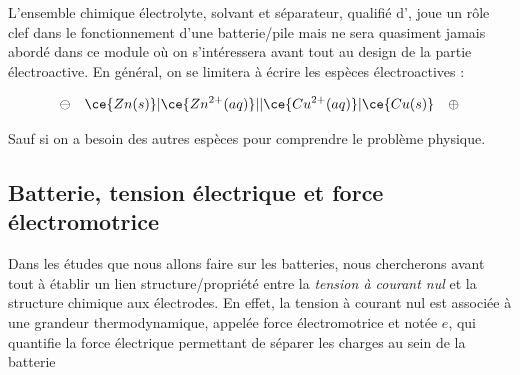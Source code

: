L'ensemble chimique électrolyte, solvant et séparateur, qualifié d', joue un rôle clef dans le fonctionnement d'une batterie/pile mais ne sera quasiment jamais abordé dans ce module où on s'intéressera avant tout au design de la partie électroactive. En général, on se limitera à écrire les espèces électroactives : 

\begin{equation*}
\ominus \quad \ce{Zn(s)} | \ce{Zn^{2+} (aq)} || \ce{Cu^{2+} (aq)} | \ce{Cu(s)} \quad \oplus
\end{equation*}

Sauf si on a besoin des autres espèces pour comprendre le problème physique.

\subsection{Batterie, tension électrique et force électromotrice}

Dans les études que nous allons faire sur les batteries, nous chercherons avant tout à établir un lien structure/propriété entre la \emph{tension à courant nul} et la structure chimique aux électrodes. En effet, la tension à courant nul est associée à une grandeur thermodynamique, appelée force électromotrice et notée $e$, qui quantifie la force électrique permettant de séparer les charges au sein de la batterie



